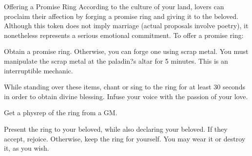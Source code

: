 \documentclass[green]{guildcamp3}
\begin{document}
\name{\gTest{}}
   \name{\gRing{}}
    Offering a Promise Ring
    According to the culture of your land, lovers can proclaim their affection by forging a promise ring and giving it to the beloved. Although this token does not imply marriage (actual proposals involve poetry), it nonetheless represents a serious emotional commitment.
    To offer a promise ring:
\begin{enum}[Directions]
      \item Obtain a promise ring. Otherwise, you can forge one using scrap metal. You must manipulate the scrap metal at the paladin?s altar for 5 minutes. This is an interruptible mechanic.
\item While standing over these items, chant or sing to the ring for at least 30 seconds in order to obtain divine blessing. Infuse your voice with the passion of your love.
\item Get a physrep of the ring from a GM.
\item Present the ring to your beloved, while also declaring your beloved. If they accept, rejoice. Otherwise, keep the ring for yourself. You may wear it or destroy it, as you wish.
       \end{enum}
\end{document}
